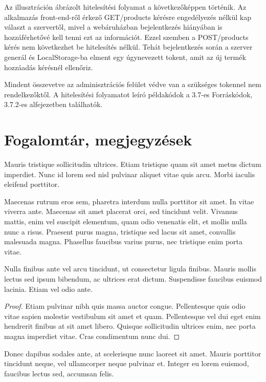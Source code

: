 Az illusztráción ábrázolt hitelesítési folyamat a következőképpen történik. Az alkalmazás front-end-ről érkező GET/products kérésre engedélyezés nélkül kap választ a szervertől, mivel a webáruházban bejelentkezés hiányában is hozzáférhetővé kell tenni ezt az információt. Ezzel szemben a POST/products kérés nem következhet be hitelesítés nélkül. Tehát bejelentkezés során a szerver generál és LocalStorage-ba elment egy úgynevezett tokent, amit az új termék hozzáadás kérésnél ellenőriz.

\bigskip


Mindent összevetve az adminisztrációs felület védve van a szükséges tokennel nem rendelkezőktől. A hitelesítési folyamatot leíró példakódok a 3.7-es Forráskódok, 3.7.2-es alfejezetben találhatók.

\section{Fogalomtár, megjegyzések} %

\begin{definition}
Mauris tristique sollicitudin ultrices. Etiam tristique quam sit amet metus dictum imperdiet. Nunc id lorem sed nisl pulvinar aliquet vitae quis arcu. Morbi iaculis eleifend porttitor.
\end{definition}

Maecenas rutrum eros sem, pharetra interdum nulla porttitor sit amet. In vitae viverra ante. Maecenas sit amet placerat orci, sed tincidunt velit. Vivamus mattis, enim vel suscipit elementum, quam odio venenatis elit, et mollis nulla nunc a risus. Praesent purus magna, tristique sed lacus sit amet, convallis malesuada magna. Phasellus faucibus varius purus, nec tristique enim porta vitae.

\begin{theorem}
Nulla finibus ante vel arcu tincidunt, ut consectetur ligula finibus. Mauris mollis lectus sed ipsum bibendum, ac ultrices erat dictum. Suspendisse faucibus euismod lacinia. Etiam vel odio ante.
\end{theorem}
\begin{proof}
Etiam pulvinar nibh quis massa auctor congue. Pellentesque quis odio vitae sapien molestie vestibulum sit amet et quam. Pellentesque vel dui eget enim hendrerit finibus at sit amet libero. Quisque sollicitudin ultrices enim, nec porta magna imperdiet vitae. Cras condimentum nunc dui.
\end{proof}

Donec dapibus sodales ante, at scelerisque nunc laoreet sit amet. Mauris porttitor tincidunt neque, vel ullamcorper neque pulvinar et. Integer eu lorem euismod, faucibus lectus sed, accumsan felis. 

